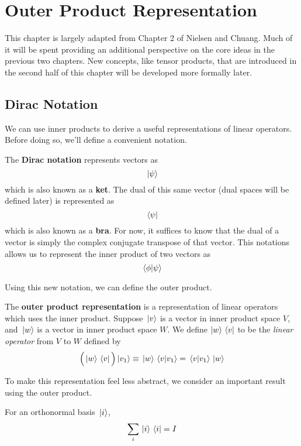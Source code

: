 \chapter{Outer Product Representation} 

This chapter is largely adapted from Chapter 2 of Nielsen and Chuang. Much of it will be spent providing an additional perspective on the core ideas in the previous two chapters. New concepts, like tensor products, that are introduced in the second half of this chapter will be developed more formally later. 

\section{Dirac Notation} 

We can use inner products to derive a useful representations of linear operators. Before doing so, we'll define a convenient notation. 

\begin{definition}
The \textbf{Dirac notation} represents vectors as 
$$\ket*{\psi}$$ which is also known as a \textbf{ket}. The dual of this same vector (dual spaces will be defined later) is represented as 
$$\bra*{\psi}$$ which is also known as a \textbf{bra}. For now, it suffices to know that the dual of a vector is simply the complex conjugate transpose of that vector. This notations allows us to represent the inner product of two vectors as 
$$\bra*{\phi}\ket*{\psi}$$
\end{definition}

Using this new notation, we can define the outer product. 

\begin{definition}
The \textbf{outer product representation} is a representation of linear operators which uses the inner product. Suppose $\ket*{v}$ is a vector in inner product space $V$, and $\ket*{w}$ is a vector in inner product space $W$. We define $\ket{w} \bra*{v}$ to be the \textit{linear operator} from $V$ to $W$ defined by 
$$\Big(\ket*{w} \bra*{v} \Big) \ket*{v_{1}} \equiv \ket*{w} \bra*{v} \ket*{v_{1}} = \bra*{v} \ket*{v_{1}} \ket*{w}$$
\end{definition}

To make this representation feel less abstract, we consider an important result using the outer product. 

\begin{lemma}
For an orthonormal basis $\ket*{i}$, 
$$\sum_{i} \ket*{i} \bra*{i} = I$$
\end{lemma}

